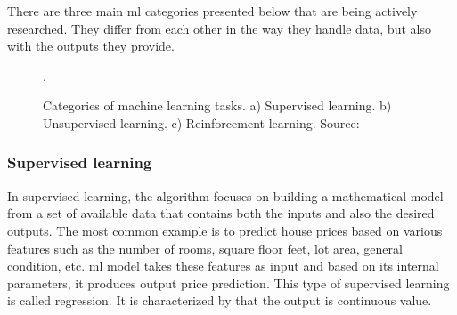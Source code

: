         There are three main \gls{ml} categories presented below that are being actively researched. They differ from each other in the way they handle data, but also with the outputs they provide.
        
        \begin{figure}[h]
            \centering
            \qquad
            \qquad
            \caption{Categories of machine learning tasks. a) Supervised learning. b) Unsupervised learning. c) Reinforcement learning. Source: \cite{kuramasupervisedunsupervised, wiki:reinforcementlearning}}.
            \label{fig:ml categories}
        \end{figure}
        
        \subsubsection{Supervised learning}
            In supervised learning, the algorithm focuses on building a mathematical model from a set of available data that contains both the inputs and also the desired outputs. The most common example is to predict house prices based on various features such as the number of rooms, square floor feet, lot area, general condition, etc. \Gls{ml} model takes these features as input and based on its internal parameters, it produces output price prediction. This type of supervised learning is called regression. It is characterized by that the output is continuous value. 
            
